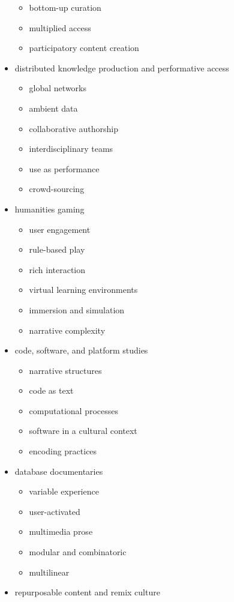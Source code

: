 \begin{itemize}
\begin{itemize}
    \item	bottom-up curation
    \item	multiplied access
    \item	participatory content creation
  \end{itemize}
  \item distributed knowledge production and performative access
  \begin{itemize}
    \item global networks
    \item	ambient data
    \item	collaborative authorship
    \item	interdisciplinary teams
    \item	use as performance
    \item	crowd-sourcing
  \end{itemize}
  \item humanities gaming
  \begin{itemize}
    \item user engagement
    \item	rule-based play
    \item	rich interaction
    \item	virtual learning environments
    \item	immersion and simulation
    \item	narrative complexity
  \end{itemize}
  \item code, software, and platform studies
  \begin{itemize}
    \item narrative structures
    \item	code as text
    \item	computational processes
    \item	software in a cultural context
    \item	encoding practices
  \end{itemize}
  \item database documentaries
  \begin{itemize}
    \item variable experience
    \item	user-activated
    \item	multimedia prose
    \item	modular and combinatoric
    \item	multilinear
  \end{itemize}
  \item repurposable content and remix culture

\end{itemize}
